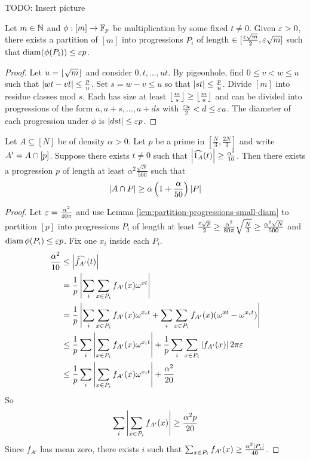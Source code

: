 \documentclass{article}
\begin{document}
TODO: Insert picture

\begin{lem}\label{lem:partition-progressions-small-diam}
  Let $m \in \mathbb N$ and $\phi : [m] \to \mathbb F_p$ be multiplication by some fixed $t \ne 0$. Given $\varepsilon > 0$, there exists a partition of $[m]$ into progressions $P_i$ of length $\in [\frac{\varepsilon\sqrt m}2, \varepsilon\sqrt m]$ such that $\operatorname{diam}(\phi(P_i)) \le \varepsilon p$.
\end{lem}
\begin{proof}
  Let $u = \left\lfloor \sqrt m\right\rfloor$ and consider $0, t, \dots, ut$. By pigeonhole, find $0 \le v < w \le u$ such that $\left\lvert wt - vt\right\rvert \le \frac pu$. Set $s = w - v \le u$ so that $\left\lvert st\right\rvert \le \frac pu$. Divide $[m]$ into residue classes mod $s$. Each has size at least $\left\lfloor \frac ms\right\rfloor \ge \left\lfloor \frac mu\right\rfloor$ and can be divided into progressions of the form $a, a + s, \dots, a + ds$ with $\frac{\varepsilon u}2 < d \le \varepsilon u$. The diameter of each progression under $\phi$ is $\left\lvert dst\right\rvert \le \varepsilon p$.
\end{proof}

\begin{lem}
  Let $A \subseteq [N]$ be of density $\alpha > 0$. Let $p$ be a prime in $[\frac N3, \frac{2N}3]$ and write $A' = A \cap [p]$. Suppose there exists $t \ne 0$ such that $\left\lvert \widehat{1_A}(t)\right\rvert \ge \frac{\alpha^2}{10}$. Then there exists a progression $p$ of length at least $\alpha^2 \frac{\sqrt N}{500}$ such that
  $$\left\lvert A \cap P\right\rvert \ge \alpha\left(1 + \frac\alpha{50}\right)\left\lvert P\right\rvert$$
\end{lem}
\begin{proof}
  Let $\varepsilon = \frac{\alpha^2}{40\pi}$ and use Lemma \ref{lem:partition-progressions-small-diam} to partition $[p]$ into progressions $P_i$ of length at least $\frac{\varepsilon \sqrt p}2 \ge \frac{\alpha^2}{80\pi}\sqrt{\frac N3} \ge \frac{\alpha^2\sqrt N}{500}$ and $\operatorname{diam} \phi(P_i) \le \varepsilon p$. Fix one $x_i$ inside each $P_i$.
  \begin{align*}
    \frac{\alpha^2}{10}
    & \le \left\lvert \widehat{f_{A'}}(t)\right\rvert \\
    & = \frac 1p\left\lvert \sum_i\sum_{x \in P_i} f_{A'}(x)\omega^{xt}\right\rvert \\
    & = \frac 1p\left\lvert \sum_i\sum_{x \in P_i} f_{A'}(x)\omega^{x_it} + \sum_i\sum_{x \in P_i} f_{A'}(x)(\omega^{xt} - \omega^{x_it})\right\rvert \\
    & \le \frac 1p\sum_i\left\lvert \sum_{x \in P_i} f_{A'}(x)\omega^{x_it}\right\rvert + \frac 1p\sum_i\sum_{x \in P_i} \left\lvert f_{A'}(x)\right\rvert 2\pi\varepsilon \\
    & \le \frac 1p\sum_i\left\lvert \sum_{x \in P_i} f_{A'}(x)\omega^{x_it}\right\rvert + \frac{\alpha^2}{20}
  \end{align*}
  So
  $$\sum_i \left\lvert \sum_{x \in P_i} f_{A'}(x)\right\rvert \ge \frac{\alpha^2p}{20}$$
  Since $f_{A'}$ has mean zero, there exists $i$ such that $\sum_{x \in P_i} f_{A'}(x) \ge \frac{\alpha^2\left\lvert P_i\right\rvert}{40}$.
\end{proof}
\end{document}
